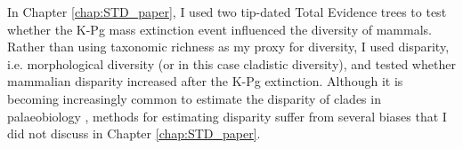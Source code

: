 In Chapter \ref{chap:STD_paper}, I used two tip-dated Total Evidence trees to test whether the K-Pg mass extinction event influenced the diversity of mammals.
Rather than using taxonomic richness as my proxy for diversity, I used disparity, i.e. morphological diversity (or in this case cladistic diversity), and tested whether mammalian disparity increased after the K-Pg extinction.
Although it is becoming increasingly common to estimate the disparity of clades in palaeobiology \citep[e.g.]{Butler2012,brusattedinosaur2012,toljagictriassic-jurassic2013,brusattegradual2014,bensonfaunal2014,Claddis,Close2015}, methods for estimating disparity suffer from several biases that I did not discuss in Chapter \ref{chap:STD_paper}.

